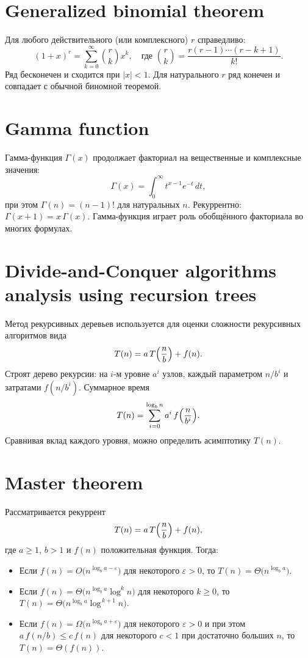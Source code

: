 \documentclass{article}
\begin{document}
	\section{Generalized binomial theorem}
	Для любого действительного (или комплексного) $r$ справедливо:
	\[
	(1+x)^r = \sum_{k=0}^\infty \binom{r}{k} x^k, \quad \text{где } \binom{r}{k} = \frac{r(r-1)\cdots(r-k+1)}{k!}.
	\]
	Ряд бесконечен и сходится при $|x|<1$. Для натурального $r$ ряд конечен и совпадает с обычной биномной теоремой.
	
	\section{Gamma function}
	Гамма-функция $\Gamma(x)$ продолжает факториал на вещественные и комплексные значения:
	\[
	\Gamma(x) = \int_0^\infty t^{x-1} e^{-t}\,dt,
	\]
	при этом $\Gamma(n)=(n-1)!$ для натуральных $n$. Рекуррентно: $\Gamma(x+1)=x\,\Gamma(x)$. Гамма-функция играет роль обобщённого факториала во многих формулах.
	
	\section{Divide-and-Conquer algorithms analysis using recursion trees}
	Метод рекурсивных деревьев используется для оценки сложности рекурсивных алгоритмов вида 
	\[
	T(n)=a\,T\Bigl(\frac{n}{b}\Bigr) + f(n).
	\]
	Строят дерево рекурсии: на $i$-м уровне $a^i$ узлов, каждый параметром $n/b^i$ и затратами $f(n/b^i)$. Суммарное время 
	\[
	T(n)=\sum_{i=0}^{\log_b n} a^i\,f\Bigl(\frac{n}{b^i}\Bigr).
	\]
	Сравнивая вклад каждого уровня, можно определить асимптотику $T(n)$.
	
	\section{Master theorem}
	Рассматривается рекуррент
	\[
	T(n)=a\,T\Bigl(\frac{n}{b}\Bigr) + f(n),
	\]
	где $a\ge1$, $b>1$ и $f(n)$ положительная функция. Тогда:
	\begin{itemize}
		\item Если $f(n) = O\bigl(n^{\log_b a - \varepsilon}\bigr)$ для некоторого $\varepsilon>0$, то $T(n) = \Theta\bigl(n^{\log_b a}\bigr)$.
		\item Если $f(n) = \Theta\bigl(n^{\log_b a}\log^k n\bigr)$ для некоторого $k\ge0$, то $T(n) = \Theta\bigl(n^{\log_b a}\log^{\,k+1}n\bigr)$.
		\item Если $f(n) = \Omega\bigl(n^{\log_b a + \varepsilon}\bigr)$ для некоторого $\varepsilon>0$ и при этом $a\,f(n/b) \le c\,f(n)$ для некоторого $c<1$ при достаточно больших $n$, то $T(n) = \Theta(f(n))$.
	\end{itemize}
	
\end{document}

